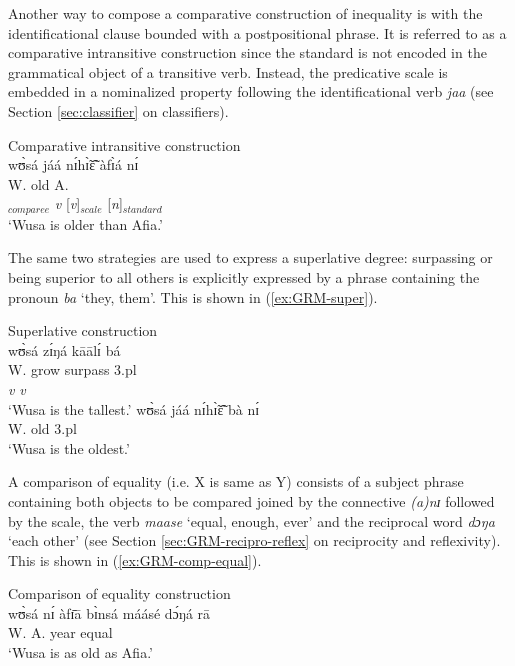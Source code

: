 \z 
 \z

Another way to compose a comparative construction of inequality is with the
identificational clause bounded with a postpositional phrase.  It is referred
to as a
comparative intransitive construction since the standard is not encoded in the
grammatical object of a transitive verb. Instead, the predicative scale is
embedded in a nominalized property following the identificational verb {\it jaa}
(see Section \ref{sec:classifier} on classifiers).


\ea\label{ex:GRM}{\rm Comparative intransitive construction}\\

\glll wʊ̀sá jáá nɪ́hɪ̃̀ɛ̃̂ àfɪ̀á nɪ́\\
W.  {\ident} old A. {\postp}\\
[{\it n}]$_{comparee}$   {\it v} [{\it v}]$_{scale}$  [{\it n}]$_{standard}$  
{} \\
\glt `Wusa is older than Afia.'
\z

The same  two strategies are used to
express a superlative degree: surpassing or being superior to all others is
explicitly expressed by a phrase containing the pronoun {\it ba} `they, them'.
This
is shown in (\ref{ex:GRM-super}).


\ea\label{ex:GRM-super}{\rm Superlative construction}\\

\ea
\glll wʊ̀sá zɪ́ŋá kāālɪ́ bá\\
W. grow surpass {\sc 3.pl}\\
{} {\it v} {\it v} {} \\
\glt  `Wusa is the tallest.'
\ex 
\gll wʊ̀sá jáá nɪ́hɪ̃̀ɛ̃̂ bà nɪ́\\
W. {\ident} old {\sc 3.pl} {\postp}\\
\glt  `Wusa is the oldest.'

\z 
 \z

A comparison of equality (i.e. X is same as Y) consists of a subject
phrase containing both objects to be  compared joined by the  connective {\it 
(a)nɪ} followed by the scale, the verb {\it maase} `equal, enough, ever' and the
reciprocal word {\it dɔŋa} `each other'  (see Section 
\ref{sec:GRM-recipro-reflex} on reciprocity
 and reflexivity). This is shown in (\ref{ex:GRM-comp-equal}).

\ea\label{ex:GRM-comp-equal}{\rm  Comparison of equality construction}\\

\gll wʊ̀sá nɪ́ àfɪ̄ā bɪ̀nsá máásé dɔ́ŋá rā \\
W. {\conn} A.  year equal {\recp} {\foc}\\
\glt `Wusa is as old as Afia.'
\z

